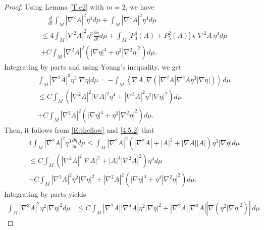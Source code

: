 \documentclass{amsart}
\theoremstyle{definition}
\numberwithin{equation}{section}
\begin{document}
\begin{proof}
Using Lemma \ref{T:e2} with $m=2$, we have
\begin{align}\label{4.5.1}
  &\quad\frac{d}{dt} \int_{M}  \left| \nabla^{2} A \right|^{2} \eta ^{4} d\mu + \int_{M}  \left| \nabla^{4} A \right|^{2} \eta ^{4} d\mu \\
  &  \leq 4 \int_{M} \left| \nabla^2 A \right|^{2}  \eta ^{3} \frac{\partial \eta}{\partial t} d\mu +\int_{M}  \Big[ P_{3}^{4}(A)+
  P_{5}^{2}(A)
  \Big] \star \, \nabla^{2} A \,\eta^4 d\mu\nonumber\\
  &+C \int_{M} \left| \nabla^{2} A \right|^{2}  \left( \left| \nabla \eta\right|^{4} + \eta^2 \left| \nabla^{2} \eta
  \right|^{2} \right) d\mu \mbox{.}\nonumber
\end{align}
 Integrating by parts and using Young's inequality, we  get
\begin{align}\label{4.5.2}
  &\int_{M} \left| \nabla^2 A \right|^{3}  \eta ^{3} |\nabla \eta| d\mu =- \int_{M}\left <   \nabla  A,  \nabla (  |\nabla^2 A|  \nabla^2 A
  \eta ^{3} |\nabla \eta| )\right >d\mu\\
&\leq    C\int_{M} ( \left| \nabla^2 A \right|^{2}   |\nabla A|^2\eta ^4 +\left| \nabla^3 A \right|^2   \eta ^{2} |\nabla \eta|^2 )  d\mu
\nonumber\\
&+C\int_{M}      \left| \nabla^2 A \right|^2      (  |\nabla \eta|^4+\eta^2|\nabla^2\eta|^2)  d\mu
\mbox{.}\nonumber
\end{align}
Then, it follows from
  \eqref{E:theflow} and  \eqref{4.5.2} that
\begin{align}\label{4.5.3}
  &
4 \int_{M} \left| \nabla^2 A \right|^{2}  \eta ^{3} \frac{\partial \eta}{\partial t} d\mu\leq \int_{M} \left| \nabla^2 A \right|^{2}
(|\nabla^2A|+|A|^3+|\nabla A| |A|)\eta ^{3} |\nabla \eta| d\mu\\
&\leq C\int_{M} ( \left| \nabla^2 A \right|^{2}   |\nabla A|^2+|A|^4|\nabla^2 A|^2)\eta ^4   d\mu\nonumber\\
&+C\int_{M}    \left| \nabla^3 A \right|^2   \eta ^{2} |\nabla \eta|^2  +  \left| \nabla^2 A \right|^2  (  |\nabla \eta|^4 +  \eta^2 \left|
\nabla^{2} \eta
  \right|^{2}) d\mu
\mbox{.}\nonumber
\end{align}
Integrating by parts yields
\begin{align*}
\int_{M}    \left| \nabla^3 A \right|^2   \eta ^{2} |\nabla \eta|^2   d\mu &\leq C\int_{M} |\nabla^2 A|   \left| \nabla^4 A \right|    \eta
^{2} |\nabla \eta|^2 + |\nabla^2 A|   \left| \nabla^3 A \right| |\nabla ( \eta ^{2} |\nabla \eta|^2)|\, d\mu

\end{align*}
\end{proof}
\end{document}
